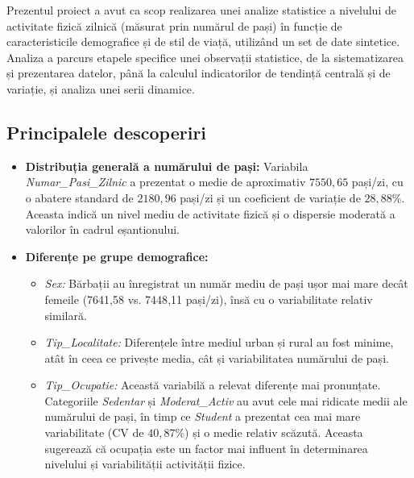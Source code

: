 \documentclass[12pt,a4paper]{report}
\begin{document}
Prezentul proiect a avut ca scop realizarea unei analize statistice a nivelului de activitate fizică zilnică (măsurat prin numărul de pași) în funcție de caracteristicile demografice și de stil de viață, utilizând un set de date sintetice. Analiza a parcurs etapele specifice unei observații statistice, de la sistematizarea și prezentarea datelor, până la calculul indicatorilor de tendință centrală și de variație, și analiza unei serii dinamice.

\subsection*{Principalele descoperiri}

\begin{itemize}
    \item \textbf{Distribuția generală a numărului de pași:} Variabila \textit{Numar\_Pasi\_Zilnic} a prezentat o medie de aproximativ \(7550{,}65\) pași/zi, cu o abatere standard de \(2180{,}96\) pași/zi și un coeficient de variație de \(28{,}88\%\). Aceasta indică un nivel mediu de activitate fizică și o dispersie moderată a valorilor în cadrul eșantionului.
    
    \item \textbf{Diferențe pe grupe demografice:}
    \begin{itemize}
        \item \textit{Sex:} Bărbații au înregistrat un număr mediu de pași ușor mai mare decât femeile (7641{,}58 vs. 7448{,}11 pași/zi), însă cu o variabilitate relativ similară.
        \item \textit{Tip\_Localitate:} Diferențele între mediul urban și rural au fost minime, atât în ceea ce privește media, cât și variabilitatea numărului de pași.
        \item \textit{Tip\_Ocupatie:} Această variabilă a relevat diferențe mai pronunțate. Categoriile \textit{Sedentar} și \textit{Moderat\_Activ} au avut cele mai ridicate medii ale numărului de pași, în timp ce \textit{Student} a prezentat cea mai mare variabilitate (CV de \(40{,}87\%\)) și o medie relativ scăzută. Aceasta sugerează că ocupația este un factor mai influent în determinarea nivelului și variabilității activității fizice.
    \end{itemize}
    

\end{itemize}
\end{document}
